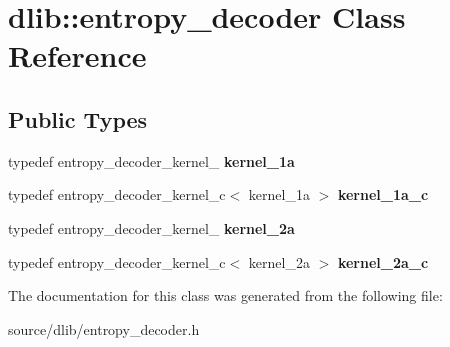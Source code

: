 \hypertarget{classdlib_1_1entropy__decoder}{
\section{dlib::entropy\_\-decoder Class Reference}
\label{classdlib_1_1entropy__decoder}
}
\subsection*{Public Types}
\begin{DoxyCompactItemize}
\item 
\hypertarget{classdlib_1_1entropy__decoder_af02ac6bd1c208f37403e9efbcffd084a}{
typedef entropy\_\-decoder\_\-kernel\_ {\bfseries kernel\_\-1a}}
\label{classdlib_1_1entropy__decoder_af02ac6bd1c208f37403e9efbcffd084a}

\item 
\hypertarget{classdlib_1_1entropy__decoder_af4473baff1a4e5f5a9d7630ee56118ed}{
typedef entropy\_\-decoder\_\-kernel\_\-c$<$ kernel\_\-1a $>$ {\bfseries kernel\_\-1a\_\-c}}
\label{classdlib_1_1entropy__decoder_af4473baff1a4e5f5a9d7630ee56118ed}

\item 
\hypertarget{classdlib_1_1entropy__decoder_a96ef43e2f5babdb5760c58261b54890a}{
typedef entropy\_\-decoder\_\-kernel\_ {\bfseries kernel\_\-2a}}
\label{classdlib_1_1entropy__decoder_a96ef43e2f5babdb5760c58261b54890a}

\item 
\hypertarget{classdlib_1_1entropy__decoder_a3ed13be5412f1b6a6f60f00d24b42bd2}{
typedef entropy\_\-decoder\_\-kernel\_\-c$<$ kernel\_\-2a $>$ {\bfseries kernel\_\-2a\_\-c}}
\label{classdlib_1_1entropy__decoder_a3ed13be5412f1b6a6f60f00d24b42bd2}

\end{DoxyCompactItemize}


The documentation for this class was generated from the following file:\begin{DoxyCompactItemize}
\item 
source/dlib/entropy\_\-decoder.h\end{DoxyCompactItemize}
